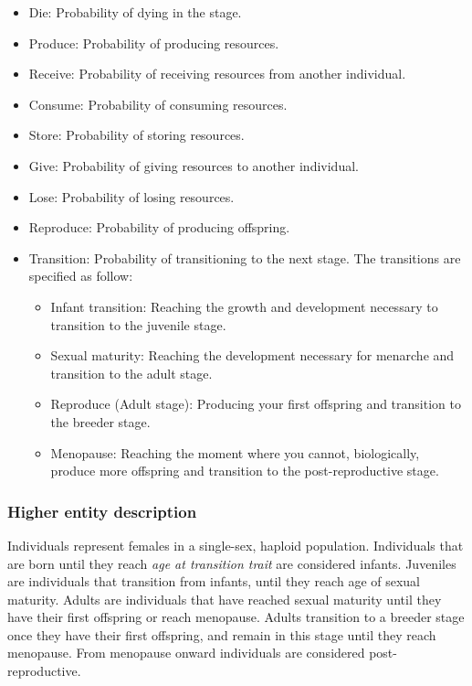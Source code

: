 \documentclass{article}
\begin{document}
\begin{itemize}
    \item Die: Probability of dying in the stage.
    \item Produce: Probability of producing resources.
    \item Receive: Probability of receiving resources from another individual.
    \item Consume: Probability of consuming resources.
    \item Store: Probability of storing resources.
    \item Give: Probability of giving resources to another individual.
    \item Lose: Probability of losing resources.
    \item Reproduce: Probability of producing offspring.
    \item Transition: Probability of transitioning to the next stage. The transitions are specified as follow:
    \begin{itemize}
        \item Infant transition: Reaching the growth and development necessary to transition to the juvenile stage.
        \item Sexual maturity: Reaching the development necessary for menarche and transition to the adult stage.
        \item Reproduce (Adult stage): Producing your first offspring and transition to the breeder stage.
        \item Menopause: Reaching the moment where you cannot, biologically, produce more offspring and transition to the post-reproductive stage.
    \end{itemize}
\end{itemize}

\subsubsection{Higher entity description}

Individuals represent females in a single-sex, haploid population. Individuals that are born until they reach \emph{age at transition trait} are considered infants. Juveniles are individuals that transition from infants, until they reach age of sexual maturity. Adults are individuals that have reached sexual maturity until they have their first offspring or reach menopause. Adults transition to a breeder stage once they have their first offspring, and remain in this stage until they reach menopause. From menopause onward individuals are considered post-reproductive.
\end{document}
